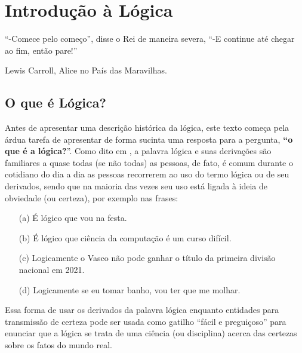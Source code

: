 \chapter{Introdução à Lógica}\label{cap:IntroducaoLogica}


\epigraph{``-Comece pelo começo'', disse o Rei de maneira severa, ``-E continue até chegar ao fim, então pare!''}{Lewis Carroll, Alice no País das Maravilhas.}


\section{O que é Lógica?}\label{sec:O-que-e-Logica}

Antes de apresentar uma descrição histórica da lógica, este texto começa pela árdua tarefa de apresentar de forma sucinta uma resposta para a pergunta, \textbf{``o que é a lógica?}''. Como dito em \cite{BenjaV1, copi1981}, a palavra lógica e suas derivações são familiares a quase todas (se não todas) as pessoas, de fato, é comum durante o cotidiano do dia a dia as pessoas recorrerem ao uso do termo lógica ou de seu derivados, sendo que na maioria das vezes seu uso está ligada à ideia de obviedade (ou certeza), por exemplo nas frases:

\begin{itemize}
    \item[(a)] É lógico que vou na festa.
    \item[(b)] É lógico que ciência da computação é um curso difícil.
    \item[(c)] Logicamente o Vasco não pode ganhar o título da primeira divisão nacional em 2021.
    \item[(d)] Logicamente se eu tomar banho, vou ter que me molhar.
\end{itemize}

Essa forma de usar os derivados da palavra lógica enquanto entidades para transmissão de certeza pode ser usada como gatilho ``fácil e preguiçoso'' para enunciar que a lógica se trata de uma ciência (ou disciplina) acerca das certezas sobre os fatos do mundo real. 

